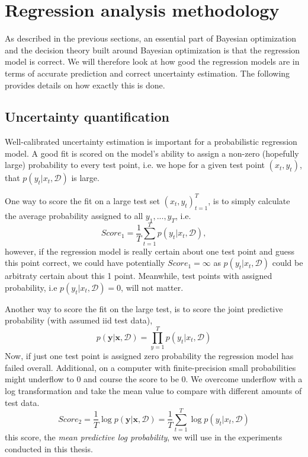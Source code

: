  
 
 

 \section{Regression analysis methodology}
 As described in the previous sections, an essential part of Bayesian optimization and the decision
 theory built around Bayesian optimization is that the regression model is correct. We will therefore
 look at how good the regression models are in terms of accurate prediction and 
 correct uncertainty estimation. The following provides details on how exactly this is done. 

 \subsection{Uncertainty quantification}
Well-calibrated uncertainty estimation is important for a probabilistic regression model. A good fit is
scored on the model's ability to assign a non-zero (hopefully large) probability to every test point, i.e.
we hope for a given test point $(x_t, y_t)$, that $p(y_t|x_t,\mathcal{D})$ is large. 

One way to score the fit on a large test set $(x_t, y_t)_{t=1}^T$, is to simply calculate the average
probability assigned to all $y_1, ..., y_T$, i.e. 
$$Score_1  = \frac{1}{T}\sum_{t=1}^T p(y_t|x_t,\mathcal{D}),$$ 
however, if the regression model is really certain about one test point and guess this point correct,  
we could have potentially $Score_1 = \infty$ as $ p(y_t|x_t,\mathcal{D})$ could be arbitraty certain about this 
1 point. Meanwhile, test points with assigned probability, i.e $p(y_t|x_t,\mathcal{D}) = 0$, will not matter. 

Another way to score the fit on the large test, is to score the joint predictive probability (with assumed iid 
test data), 
$$p(\textbf{y}|\textbf{x}, \mathcal{D}) = \prod_{y=1}^T p(y_t|x_t, \mathcal{D})$$
Now, if just one test point is assigned zero probability the regression model has failed overall. 
Additional, on a computer with finite-precision small probabilities might underflow to 0 and course
the score to be 0. We overcome underflow with a log transformation and take the mean value to 
compare with different amounts of test data.
$$ Score_2 = \frac{1}{T} \log p(\textbf{y}|\textbf{x}, \mathcal{D}) = \frac{1}{T}\sum_{t=1}^T \log p(y_t|x_t, \mathcal{D})$$
this score, the \textit{mean predictive log probability}, we will use in the experiments conducted in this thesis. 

